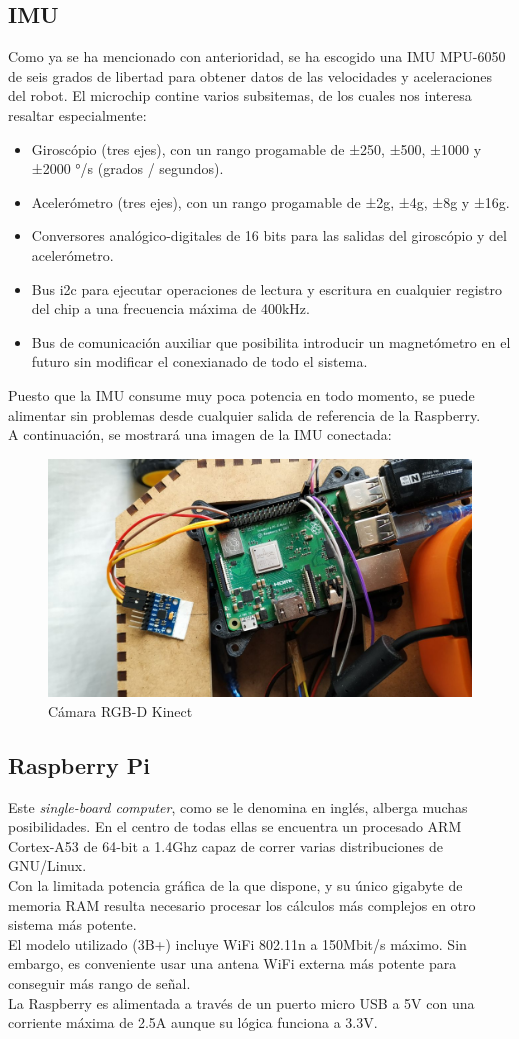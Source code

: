 \subsection{IMU}\label{imu_hardw}
Como ya se ha mencionado con anterioridad, se ha escogido una IMU MPU-6050 de seis grados de libertad para obtener datos de las velocidades y aceleraciones del robot. El microchip contine varios subsitemas, de los cuales nos interesa resaltar especialmente:
\begin{itemize}
	\item Giroscópio (tres ejes), con un rango progamable de ±250, ±500, ±1000 y ±2000 °/s (grados / segundos).
	\item Acelerómetro (tres ejes), con un rango progamable de ±2g, ±4g, ±8g y ±16g.
	\item Conversores analógico-digitales de 16 bits para las salidas del giroscópio y del acelerómetro.
	\item Bus i2c para ejecutar operaciones de lectura y escritura en cualquier registro del chip a una frecuencia máxima de 400kHz.
	\item Bus de comunicación auxiliar que posibilita introducir un magnetómetro en el futuro sin modificar el conexianado de todo el sistema.
\end{itemize}
Puesto que la IMU consume muy poca potencia en todo momento, se puede alimentar sin problemas desde cualquier salida de referencia de la Raspberry. \\

A continuación, se mostrará una imagen de la IMU conectada:
\begin{figure}[h!]
	\centering
	\includegraphics[width=.5\textwidth]{images/hw/rpi_imu}
	\caption{Cámara RGB-D Kinect}
\end{figure}


\subsection{Raspberry Pi}
Este \textit{single-board computer}, como se le denomina en inglés, alberga muchas posibilidades. En el centro de todas ellas se encuentra un procesado ARM Cortex-A53 de 64-bit a 1.4Ghz capaz de correr varias distribuciones de GNU/Linux. \\
Con la limitada potencia gráfica de la que dispone, y su único gigabyte de memoria RAM resulta necesario procesar los cálculos más complejos en otro sistema más potente.\\
El modelo utilizado (3B+) incluye WiFi 802.11n a 150Mbit/s máximo. Sin embargo, es conveniente usar una antena WiFi externa más potente para conseguir más rango de señal.\\
La Raspberry es alimentada a través de un puerto micro USB a 5V con una corriente máxima de 2.5A aunque su lógica funciona a 3.3V.

